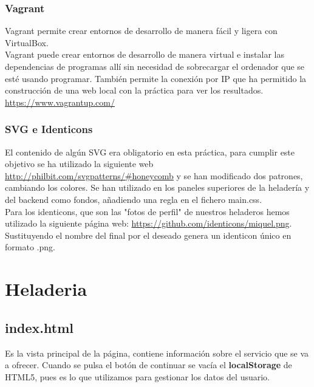 \documentclass[11pt,a4paper]{article}
\begin{document}
\subsubsection{Vagrant}
Vagrant permite crear entornos de desarrollo de manera fácil y ligera con VirtualBox.\\
Vagrant puede crear entornos de desarrollo de manera virtual e instalar las dependencias de programas allí sin necesidad de sobrecargar el ordenador que se esté usando programar. También permite la conexión por IP que ha permitido la construcción de una web local con la práctica para ver los resultados. \url{https://www.vagrantup.com/}

\subsubsection{SVG e Identicons}
El contenido de algún SVG era obligatorio en esta práctica, para cumplir este objetivo se ha utilizado la siguiente web \url{http://philbit.com/svgpatterns/#honeycomb} y se han modificado dos patrones, cambiando los colores. Se han utilizado en los paneles superiores de la heladería y del backend como fondos, añadiendo una regla en el fichero main.css. \\
Para los identicons, que son las "fotos de perfil" de nuestros heladeros hemos utilizado la siguiente página web: \url{https://github.com/identicons/miquel.png}. Sustituyendo el nombre del final por el deseado genera un identicon único en formato .png.

\section{Heladeria}
\subsection{index.html}
Es la vista principal de la página, contiene información sobre el servicio que se va a ofrecer. Cuando se pulsa el botón de continuar se vacía el \textbf{localStorage} de HTML5, pues es lo que utilizamos para gestionar los datos del usuario.
\end{document}
